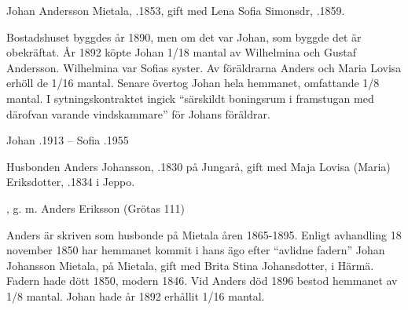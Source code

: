 Johan Andersson Mietala, .1853, gift med Lena Sofia Simonsdr, .1859.
\begin{jhchildren}
  \item {}
  \item {}
  \item {}
  \item {}
  \item {}
  \item {}
  \item {}
  \item {}
\end{jhchildren}
Bostadshuset byggdes år 1890, men om det var Johan, som byggde det är obekräftat. År 1892 köpte Johan 1/18 mantal av Wilhelmina och Gustaf Andersson. Wilhelmina var Sofias syster. Av föräldrarna Anders och Maria Lovisa erhöll de 1/16 mantal. Senare övertog Johan hela hemmanet, omfattande 1/8 mantal. I sytningskontraktet ingick ``särskildt boningsrum i framstugan med därofvan varande vindskammare'' för Johans föräldrar.

Johan .1913  --  Sofia .1955


Husbonden Anders Johansson,  .1830 på Jungarå, gift med Maja Lovisa (Maria) Eriksdotter, .1834 i Jeppo.
\begin{jhchildren}
  \item {}
  \item {}
  \item {}
  \item {}
  \item {}
  \item {}, g. m. Anders Eriksson (Grötas 111)
  \item {}
\end{jhchildren}
Anders är skriven som husbonde på Mietala åren 1865-1895. Enligt avhandling 18 november 1850 har hemmanet kommit i hans ägo efter	``avlidne fadern'' Johan Johansson Mietala,  på Mietala, gift med Brita Stina Johansdotter,  i Härmä. Fadern hade dött 1850, modern 1846.	Vid Anders död 1896 bestod hemmanet av 1/8 mantal. Johan hade år 1892 erhållit 1/16 mantal.

